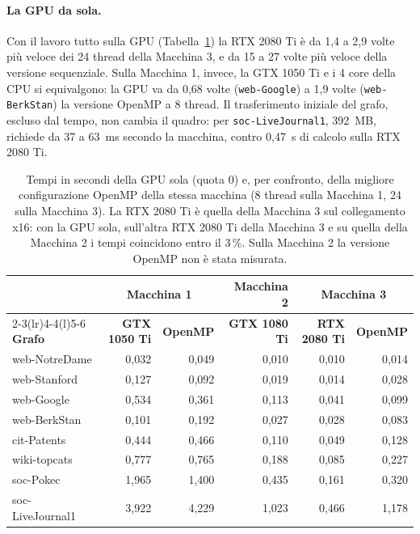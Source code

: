 \documentclass[11pt,a4paper]{article}
\begin{document}
\paragraph{La GPU da sola.}
Con il lavoro tutto sulla GPU (Tabella~\ref{tab:gpu-sola}) la RTX 2080
Ti è da 1,4 a 2,9 volte più veloce dei 24 thread della Macchina 3, e da 15 a
27 volte più veloce della versione sequenziale. Sulla Macchina 1, invece,
la GTX 1050 Ti e i 4 core della CPU si equivalgono: la GPU va da 0,68 volte
(\texttt{web-Google}) a 1,9 volte (\texttt{web-BerkStan}) la versione OpenMP a
8 thread. Il trasferimento iniziale del grafo, escluso dal tempo, non cambia
il quadro: per \texttt{soc-LiveJournal1}, 392~MB, richiede da 37 a 63~ms
secondo la macchina, contro 0,47~s di calcolo sulla RTX 2080 Ti.

\begin{table}[h]
\centering
\caption{Tempi in secondi della GPU sola (quota 0) e, per confronto, della
migliore configurazione OpenMP della stessa macchina (8 thread sulla Macchina
1, 24 sulla Macchina 3). La RTX 2080 Ti è quella della Macchina 3 sul
collegamento x16: con la GPU sola, sull'altra RTX 2080 Ti della Macchina 3
e su quella della Macchina 2 i tempi coincidono entro il 3\,\%. 
Sulla Macchina 2 la versione OpenMP non è stata misurata.}
\label{tab:gpu-sola}
\small
\begin{tabular}{@{}lrrrrr@{}}
\toprule
 & \multicolumn{2}{c}{\textbf{Macchina 1}} & \textbf{Macchina 2} &
\multicolumn{2}{c}{\textbf{Macchina 3}} \\
\cmidrule(lr){2-3}\cmidrule(lr){4-4}\cmidrule(l){5-6}
\textbf{Grafo} & \textbf{GTX 1050 Ti} & \textbf{OpenMP} & \textbf{GTX 1080 Ti} &
\textbf{RTX 2080 Ti} & \textbf{OpenMP} \\
\midrule
web-NotreDame    & 0,032 & 0,049 & 0,010 & 0,010 & 0,014 \\
web-Stanford     & 0,127 & 0,092 & 0,019 & 0,014 & 0,028 \\
web-Google       & 0,534 & 0,361 & 0,113 & 0,041 & 0,099 \\
web-BerkStan     & 0,101 & 0,192 & 0,027 & 0,028 & 0,083 \\
cit-Patents      & 0,444 & 0,466 & 0,110 & 0,049 & 0,128 \\
wiki-topcats     & 0,777 & 0,765 & 0,188 & 0,085 & 0,227 \\
soc-Pokec        & 1,965 & 1,400 & 0,435 & 0,161 & 0,320 \\
soc-LiveJournal1 & 3,922 & 4,229 & 1,023 & 0,466 & 1,178 \\
\bottomrule
\end{tabular}
\end{table}
\end{document}
